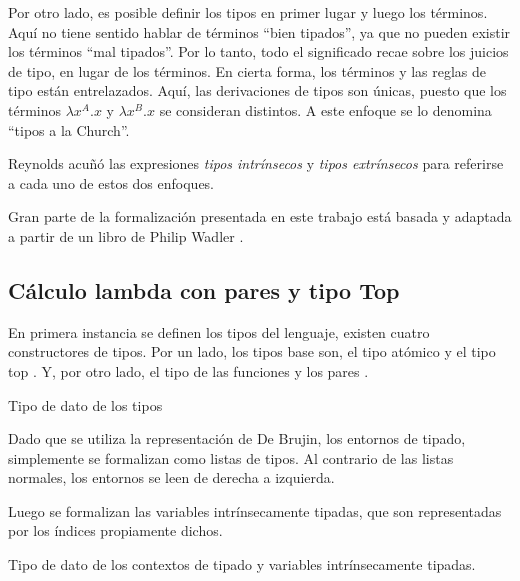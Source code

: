 \documentclass[]{report}
\begin{document}
	Por otro lado, es posible definir los tipos en primer lugar y luego los términos.
	Aquí no tiene sentido hablar de términos ``bien tipados'', ya que no pueden existir los términos ``mal tipados''.
	Por lo tanto, todo el significado recae sobre los juicios de tipo, en lugar de los términos.
	En cierta forma, los términos y las reglas de tipo están entrelazados.
	Aquí, las derivaciones de tipos son únicas, puesto que los términos $\lambda x^A.x$ y $\lambda x^B.x$ se consideran distintos.
	A este enfoque se lo denomina ``tipos a la Church''.
	
	Reynolds \cite{reynolds_1998} acuñó las expresiones \textit{tipos intrínsecos} y \textit{tipos extrínsecos} para referirse a cada uno de estos dos enfoques.
	
	Gran parte de la formalización presentada en este trabajo está basada y adaptada a partir de un libro de Philip Wadler \cite{plfa}.
	
	\subsection{Cálculo lambda con pares y tipo Top}
	
	En primera instancia se definen los tipos del lenguaje, existen cuatro constructores de tipos.
	Por un lado, los tipos base son, el tipo atómico \AgdaInductiveConstructor{$\tau$} y el tipo top \AgdaInductiveConstructor{$\top$}.
	Y, por otro lado, el tipo de las funciones \AgdaInductiveConstructor{$\_\Rightarrow\_$} y los pares \AgdaInductiveConstructor{$\_\times\_$}.

	\begin{codigo}
		Tipo de dato de los tipos
		
	\end{codigo}
	
	Dado que se utiliza la representación de De Brujin, los entornos de tipado, simplemente se formalizan como listas de tipos.
	Al contrario de las listas normales, los entornos se leen de derecha a izquierda.
	
	Luego se formalizan las variables intrínsecamente tipadas, que son representadas por los índices propiamente dichos.
	
	\begin{codigo}
		Tipo de dato de los contextos de tipado y variables intrínsecamente tipadas.
	\end{codigo}
	
\end{document}
